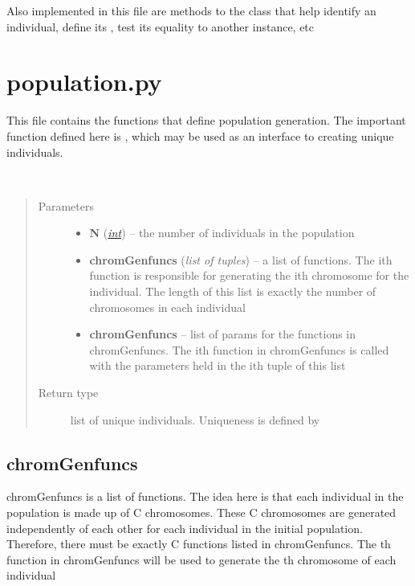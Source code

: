 \documentclass[letterpaper,10pt,english]{sphinxmanual}
\begin{document}
Also implemented in this file are methods to the  class that help identify an individual, define its , test its equality to another  instance, etc


\section{population.py}
\label{Overview:population-py}
This file contains the functions that define population generation.
The important function defined here is {\hyperref[Overview:genPop]{}}, which may be used as an interface to creating unique individuals.

\begin{fulllineitems}
\label{Overview:genPop}~\begin{quote}\begin{description}
\item[{Parameters}] \leavevmode\begin{itemize}
\item {} 
\textbf{N} (\href{http://docs.python.org/library/functions.html\#int}{\emph{int}}) -- the number of individuals in the population

\item {} 
\textbf{chromGenfuncs} (\emph{list of tuples}) -- a list of functions. The ith function is responsible for generating the ith chromosome for the individual. The length of this list is exactly the number of chromosomes in each individual

\item {} 
\textbf{chromGenfuncs} -- list of params for the functions in chromGenfuncs. The ith function in chromGenfuncs is called with the parameters held in the ith tuple of this list

\end{itemize}

\item[{Return type}] \leavevmode
list of unique individuals. Uniqueness is defined by 

\end{description}\end{quote}

\end{fulllineitems}



\subsection{chromGenfuncs}
\label{Overview:chromgenfuncs}
chromGenfuncs is a list of functions. The idea here is that each individual in the population is made up of C chromosomes. These C chromosomes are generated independently of each other for each individual in the initial population. Therefore, there must be exactly C functions listed in chromGenfuncs. The  th function in chromGenfuncs will be used to generate the  th chromosome of each individual
\end{document}
